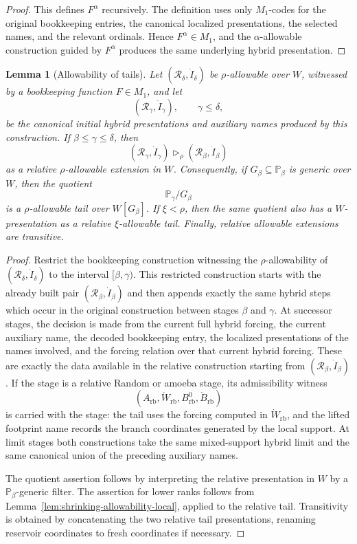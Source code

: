 \documentclass[a4paper,11pt]{article}
\newtheorem{lemma}[theorem]{Lemma}
\begin{document}
\begin{proof}
This defines \(F^\alpha\) recursively.  The definition uses only \(M_1\)-codes
for the original bookkeeping entries, the canonical localized presentations,
the selected names, and the relevant ordinals.  Hence \(F^\alpha\in M_1\), and
the \(\alpha\)-allowable construction guided by \(F^\alpha\) produces the same
underlying hybrid presentation.
\end{proof}

\begin{lemma}[Allowability of tails]\label{lem:tail-allowability-local}
Let \((\mathcal R_\delta,\dot I_\delta)\) be \(\rho\)-allowable over \(W\),
witnessed by a bookkeeping function \(F\in M_1\), and let
\[
   (\mathcal R_\gamma,\dot I_\gamma),\qquad \gamma\leq\delta,
\]
be the canonical initial hybrid presentations and auxiliary names produced by
this construction.  If \(\beta\leq\gamma\leq\delta\), then
\[
   (\mathcal R_\gamma,\dot I_\gamma)
   \triangleright_\rho
   (\mathcal R_\beta,\dot I_\beta)
\]
as a relative \(\rho\)-allowable extension in \(W\).  Consequently, if
\(G_\beta\subseteq\mathbb P_\beta\) is generic over \(W\), then the quotient
\[
   \mathbb P_\gamma/G_\beta
\]
is a \(\rho\)-allowable tail over \(W[G_\beta]\).  If \(\xi<\rho\), then the
same quotient also has a \(W\)-presentation as a relative \(\xi\)-allowable
tail.  Finally, relative allowable extensions are transitive.
\end{lemma}

\begin{proof}
Restrict the bookkeeping construction witnessing the \(\rho\)-allowability of
\((\mathcal R_\delta,\dot I_\delta)\) to the interval \([\beta,\gamma)\).  This
restricted construction starts with the already built pair
\((\mathcal R_\beta,\dot I_\beta)\) and then appends exactly the same hybrid steps
which occur in the original construction between stages \(\beta\) and
\(\gamma\).  At successor stages, the decision is made from the current full
hybrid forcing, the current auxiliary name, the decoded bookkeeping entry, the
localized presentations of the names involved, and the forcing relation over
that current hybrid forcing.  These are exactly the data available in the
relative construction starting from \((\mathcal R_\beta,\dot I_\beta)\).  If the
stage is a relative Random or amoeba stage, its admissibility witness
\[
   (A_{\mathrm{rb}},\dot W_{\mathrm{rb}},B^0_{\mathrm{rb}},\dot B_{\mathrm{rb}})
\]
is carried with the stage: the tail uses the forcing computed in
\(\dot W_{\mathrm{rb}}\), and the lifted footprint name records the branch
coordinates generated by the local support.  At limit stages both constructions
take the same mixed-support hybrid limit and the same canonical union of the
preceding auxiliary names.

The quotient assertion follows by interpreting the relative presentation in
\(W\) by a \(\mathbb P_\beta\)-generic filter.  The assertion for lower
ranks follows from Lemma~\ref{lem:shrinking-allowability-local}, applied to the
relative tail.  Transitivity is obtained by concatenating the two relative tail
presentations, renaming reservoir coordinates to fresh coordinates if
necessary.
\end{proof}
\end{document}
